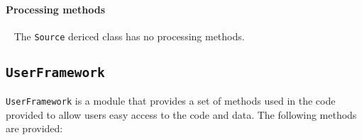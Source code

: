 \paragraph{Processing methods} ~\newline
\noindent
The \texttt{Source} dericed class has no processing methods.

\FloatBarrier

\subsection{\texttt{UserFramework}}
\label{SubSubSect:UsrFrmwrk}

\texttt{UserFramework} is a module that provides a set of methods used
in the code provided to allow users easy access to the code and data.
The following methods are provided: \\
